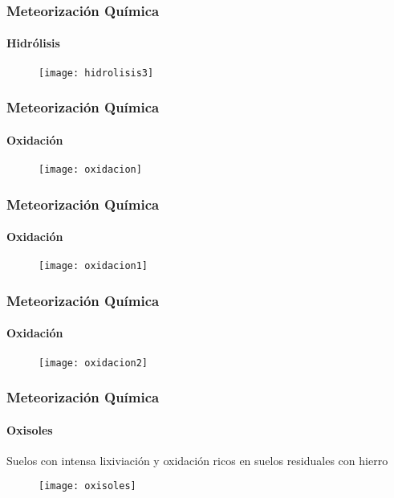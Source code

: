 \documentclass{beamer}
\begin{document}
\begin{frame}
\frametitle{Meteorización Química}
\framesubtitle{Hidrólisis}
\begin{figure}
\begin{center}
   	\texttt{[image: hidrolisis3]}
\end{center}
\end{figure}
\end{frame}
\begin{frame}
\frametitle{Meteorización Química}
\framesubtitle{Oxidación}
\begin{figure}
\begin{center}
   	\texttt{[image: oxidacion]}
\end{center}
\end{figure}
\end{frame}
\begin{frame}
\frametitle{Meteorización Química}
\framesubtitle{Oxidación}
\begin{figure}
\begin{center}
   	\texttt{[image: oxidacion1]}
\end{center}
\end{figure}
\end{frame}
\begin{frame}
\frametitle{Meteorización Química}
\framesubtitle{Oxidación}
\begin{figure}
\begin{center}
   	\texttt{[image: oxidacion2]}
\end{center}
\end{figure}
\end{frame}
\begin{frame}
\frametitle{Meteorización Química}
\framesubtitle{Oxisoles}
\small{Suelos con intensa lixiviación y oxidación ricos en suelos residuales con hierro}
\begin{figure}
\begin{center}
   	\texttt{[image: oxisoles]}
\end{center}
\end{figure}
\end{frame}
\end{document}
